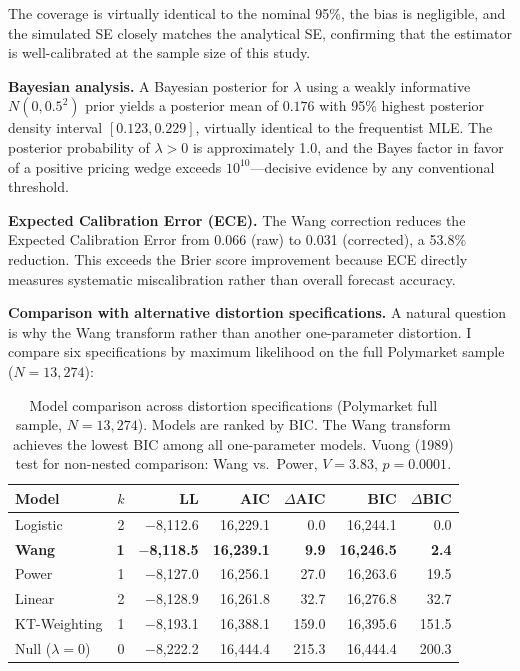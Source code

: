 \documentclass[12pt,a4paper]{article}
\begin{document}
The coverage is virtually identical to the nominal 95\%, the bias is
negligible, and the simulated SE closely matches the analytical SE,
confirming that the estimator is well-calibrated at the sample size of
this study.

\textbf{Bayesian analysis.} A Bayesian posterior for \(\lambda\) using a
weakly informative \(N(0, 0.5^2)\) prior yields a posterior mean of
\(0.176\) with 95\% highest posterior density interval
\([0.123, 0.229]\), virtually identical to the frequentist MLE. The
posterior probability of \(\lambda > 0\) is approximately 1.0, and the
Bayes factor in favor of a positive pricing wedge exceeds
\(10^{10}\)---decisive evidence by any conventional threshold.

\textbf{Expected Calibration Error (ECE).} The Wang correction reduces
the Expected Calibration Error from 0.066 (raw) to 0.031 (corrected), a
53.8\% reduction. This exceeds the Brier score improvement because ECE
directly measures systematic miscalibration rather than overall forecast
accuracy.

\textbf{Comparison with alternative distortion specifications.} A
natural question is why the Wang transform rather than another
one-parameter distortion. I compare six specifications by maximum
likelihood on the full Polymarket sample (\(N = 13{,}274\)):

\begin{table}[H]
\centering
\small
\caption{Model comparison across distortion specifications (Polymarket full sample, $N = 13{,}274$). Models are ranked by BIC. The Wang transform achieves the lowest BIC among all one-parameter models. Vuong (1989) test for non-nested comparison: Wang vs.\ Power, $V = 3.83$, $p = 0.0001$.}
\label{tab:model_comparison}
\begin{tabular}{lrrrrrr}
\toprule
Model & $k$ & LL & AIC & $\Delta$AIC & BIC & $\Delta$BIC \\
\midrule
Logistic & 2 & $-$8,112.6 & 16,229.1 & 0.0 & 16,244.1 & 0.0 \\
\textbf{Wang} & \textbf{1} & $-$\textbf{8,118.5} & \textbf{16,239.1} & \textbf{9.9} & \textbf{16,246.5} & \textbf{2.4} \\
Power & 1 & $-$8,127.0 & 16,256.1 & 27.0 & 16,263.6 & 19.5 \\
Linear & 2 & $-$8,128.9 & 16,261.8 & 32.7 & 16,276.8 & 32.7 \\
KT-Weighting & 1 & $-$8,193.1 & 16,388.1 & 159.0 & 16,395.6 & 151.5 \\
Null ($\lambda = 0$) & 0 & $-$8,222.2 & 16,444.4 & 215.3 & 16,444.4 & 200.3 \\
\bottomrule
\end{tabular}
\end{table}
\end{document}
